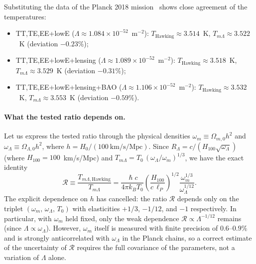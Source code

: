 \documentclass[10pt,a4paper]{article}
\DeclareRobustCommand{\hbar}{\hslash}
\begin{document}
Substituting the data of the Planck 2018 mission~\cite{Planck2018} shows close agreement of the temperatures:
\begin{itemize}
\item TT,TE,EE+lowE ($\Lambda \approx 1.084 \times 10^{-52}$~m$^{-2}$): $T_{\mathrm{Hawking}} \approx 3.514$~K, $T_{m\Lambda} \approx 3.522$~K (deviation $-0.23\%$);
\item TT,TE,EE+lowE+lensing ($\Lambda \approx 1.089 \times 10^{-52}$~m$^{-2}$): $T_{\mathrm{Hawking}} \approx 3.518$~K, $T_{m\Lambda} \approx 3.529$~K (deviation $-0.31\%$);
\item TT,TE,EE+lowE+lensing+BAO ($\Lambda \approx 1.106 \times 10^{-52}$~m$^{-2}$): $T_{\mathrm{Hawking}} \approx 3.532$~K, $T_{m\Lambda} \approx 3.553$~K (deviation $-0.59\%$).
\end{itemize}

\paragraph{What the tested ratio depends on.}
Let us express the tested ratio through the physical densities $\omega_m \equiv \Omega_{m,0}h^2$ and $\omega_\Lambda \equiv \Omega_{\Lambda,0}h^2$, where $h = H_0/(100~\text{km/s/Mpc})$. Since $R_\Lambda = c/(H_{100}\sqrt{\omega_\Lambda})$ (where $H_{100} = 100$~km/s/Mpc) and $T_{m\Lambda} = T_0\,(\omega_\Lambda/\omega_m)^{1/3}$, we have the exact identity
\begin{equation}
\mathcal{R} \equiv \frac{T_{m\Lambda\mathrm{, Hawking}}}{T_{m\Lambda}}
= \frac{\hbar c}{4\pi k_B T_0}\left(\frac{H_{100}}{c\,\ell_P}\right)^{1/2}\frac{\omega_m^{1/3}}{\omega_\Lambda^{1/12}}.
\label{eq:ratio_omegas}
\end{equation}
The explicit dependence on $h$ has cancelled: the ratio $\mathcal{R}$ depends only on the triplet $(\omega_m,\,\omega_\Lambda,\,T_0)$ with elasticities $+1/3$, $-1/12$, and $-1$ respectively. In particular, with $\omega_m$ held fixed, only the weak dependence $\mathcal{R}\propto\Lambda^{-1/12}$ remains (since $\Lambda \propto \omega_\Lambda$). However, $\omega_m$ itself is measured with finite precision of $0.6$--$0.9\%$ and is strongly anticorrelated with $\omega_\Lambda$ in the Planck chains, so a correct estimate of the uncertainty of $\mathcal{R}$ requires the full covariance of the parameters, not a variation of $\Lambda$ alone.
\end{document}
